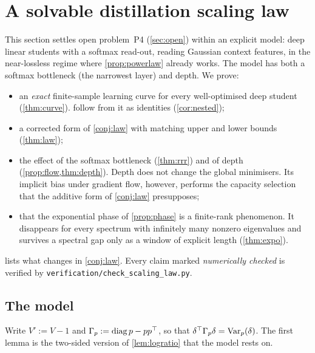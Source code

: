 \section{A solvable distillation scaling law}\label{sec:law}

This section settles open problem~P4 (\cref{sec:open}) within an explicit model: deep linear students
with a softmax read-out, reading Gaussian context features, in the near-lossless regime where
\cref{prop:powerlaw} already works. The model has both a softmax bottleneck (the narrowest layer) and depth.
We prove:
\begin{itemize}[nosep,leftmargin=*]
\item an \emph{exact} finite-sample learning curve for every well-optimised deep student
(\cref{thm:curve}).  follow from it as identities (\cref{cor:nested});
\item a corrected form of \cref{conj:law} with matching upper and lower bounds (\cref{thm:law});
\item the effect of the softmax bottleneck (\cref{thm:rrr}) and of depth (\cref{prop:flow,thm:depth}).
Depth does not change the global minimisers. Its implicit bias under gradient flow, however, performs
the capacity selection that the additive form of \cref{conj:law} presupposes;
\item that the exponential phase of \cref{prop:phase} is a finite-rank phenomenon. It disappears for every
spectrum with infinitely many nonzero eigenvalues and survives a spectral gap only as a window of
explicit length (\cref{thm:expo}).
\end{itemize}
 lists what changes in \cref{conj:law}. Every claim marked \emph{numerically
checked} is verified by \texttt{verification/check\_scaling\_law.py}.

\subsection{The model}\label{sec:law-model}

Write $V':=V-1$ and $\Gamma_p:=\operatorname{diag} p-pp^\top$, so that $\delta^\top\Gamma_p\delta=\operatorname{Var}_p(\delta)$. The first
lemma is the two-sided version of \cref{lem:logratio} that the model rests on.

